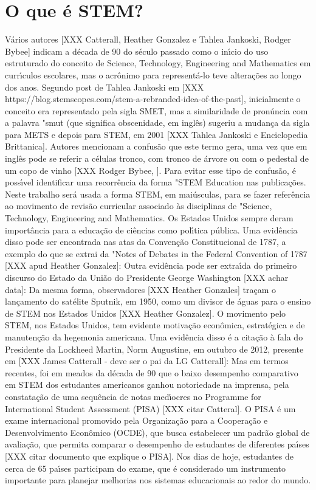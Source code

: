 \documentclass[
12pt,		%
openright,	%
twoside,  %
a4paper,			%
chapter=TITLE,		%
english,			%
french,				%
spanish,			%
brazil				%
]{USPSC-classe/USPSC}
\begin{document}
\section[O que \'e STEM?]{O que \'e STEM?}\label{O que \'e STEM?}
V\'arios autores [XXX Catterall, Heather Gonzalez e  Tahlea Jankoski, Rodger Bybee] indicam a d\'ecada de 90 do s\'eculo passado como o in\'{\i}cio do uso estruturado do conceito de Science, Technology, Engineering and Mathematics em curr\'{\i}culos escolares, mas o acr\^onimo para represent\'a-lo teve altera\c{c}\~oes ao longo dos anos. Segundo post de Tahlea Jankoski em [XXX https://blog.stemscopes.com/stem-a-rebranded-idea-of-the-past], inicialmente o conceito era representado pela sigla SMET, mas a similaridade de pron\'uncia com a palavra "smut (que significa obscenidade, em ingl\^es) sugeriu a mudan\c{c}a da sigla para METS e depois para STEM, em 2001 [XXX Tahlea Jankoski e Enciclopedia Brittanica]. 
Autores mencionam a confus\~ao que este termo gera, uma vez que em ingl\^es pode se referir a c\'elulas tronco, com tronco de \'arvore ou com o pedestal de um copo de vinho [XXX Rodger Bybee, ]. Para evitar esse tipo de confus\~ao, \'e poss\'{\i}vel identificar uma recorr\^encia da forma "STEM Education nas publica\c{c}\~oes. Neste trabalho ser\'a usada a forma STEM, em mai\'usculas, para se fazer refer\^encia ao movimento de revis\~ao curricular associado \`as disciplinas de "Science, Technology, Engineering and Mathematics.  
Os Estados Unidos sempre deram import\^ancia para a educa\c{c}\~ao de ci\^encias como pol\'{\i}tica p\'ublica. Uma evid\^encia disso pode ser encontrada nas atas da Conven\c{c}\~ao Constitucional de 1787, a exemplo do que se extrai da "Notes of Debates in the Federal Convention of 1787 [XXX apud Heather Gonzalez]:
Outra evid\^encia pode ser extra\'{\i}da do primeiro discurso do Estado da Uni\~ao do Presidente George Washington [XXX achar data]:
Da mesma forma, observadores [XXX Heather Gonzales] tra\c{c}am o lan\c{c}amento do sat\'elite Sputnik, em 1950, como um divisor de \'aguas para o ensino de STEM nos Estados Unidos [XXX Heather Gonzalez].
O movimento pelo STEM, nos Estados Unidos, tem evidente motiva\c{c}\~ao econ\^omica, estrat\'egica e de manuten\c{c}\~ao da hegemonia americana. Uma evid\^encia disso \'e a cita\c{c}\~ao \`a fala do Presidente da Lockheed Martin, Norm Augustine, em outubro de 2012, presente em [XXX James Catterall - deve ser o pai da LG Catterall]:
Mas em termos recentes, foi em meados da d\'ecada de 90 que o baixo desempenho comparativo em STEM dos estudantes americanos ganhou notoriedade na imprensa, pela constata\c{c}\~ao de uma sequ\^encia de notas med\'{\i}ocres no Programme for International Student Assessment (PISA) [XXX citar Catteral]. O PISA \'e um exame internacional promovido pela Organiza\c{c}\~ao para a Coopera\c{c}\~ao e Desenvolvimento Econ\^omico (OCDE), que busca estabelecer um padr\~ao global de avalia\c{c}\~ao, que permita comparar o desempenho de estudantes de diferentes pa\'{\i}ses [XXX citar documento que explique o PISA]. Nos dias de hoje, estudantes de cerca de 65 pa\'{\i}ses participam do exame, que \'e considerado um instrumento importante para planejar melhorias nos sistemas educacionais ao redor do mundo.
\end{document}
